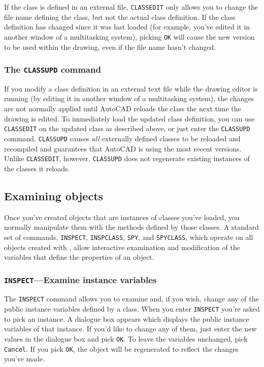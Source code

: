 \documentclass{article}
\begin{document}
If the class is defined in an external file, {\tt CLASSEDIT} only
allows you to change the file name defining the class, but not the actual
class definition.  If the class definition has changed since it
was last loaded (for example, you've edited it in another window of a
multitasking system), picking {\tt OK} will cause the new version to
be used within the drawing, even if the file name hasn't changed.

\subsubsection{The {\tt CLASSUPD} command}

If you modify a class definition in an external text file while the
drawing editor is running (by editing it in another window of a
multitasking system), the changes are not normally applied until
AutoCAD reloads the class the next time the drawing is edited.  To
immediately load the updated class definition, you can use {\tt
CLASSEDIT} on the updated class as described above, or just enter the
{\tt CLASSUPD} command.  {\tt CLASSUPD} causes {\em all} externally
defined classes to be reloaded and recompiled and guarantees that
AutoCAD is using the most recent versions.  Unlike {\tt CLASSEDIT},
however, {\tt CLASSUPD} does not regenerate existing instances of the
classes it reloads.

\subsection{Examining objects}

Once you've created objects that are instances of classes you've
loaded, you normally manipulate them with the methods defined by those
classes.  A standard set of commands, {\tt INSPECT}, {\tt INSPCLASS},
{\tt SPY}, and {\tt SPYCLASS}, which operate on all objects created
with \cw , allow interactive examination and modification of the
variables that define the properties of an object.

\subsubsection{{\tt INSPECT}---Examine instance variables}

The {\tt INSPECT} command allows you to examine and, if you wish,
change any of the public instance variables defined by a class.  When
you enter {\tt INSPECT} you're asked to pick an instance.  A dialogue
box appears which displays the public instance variables of that
instance.  If you'd like to change any of them, just enter the new
values in the dialogue box and pick {\tt OK}\@.  To leave the variables
unchanged, pick {\tt Cancel}.  If you pick {\tt OK}, the object will
be regenerated to reflect the changes you've made.
\end{document}
